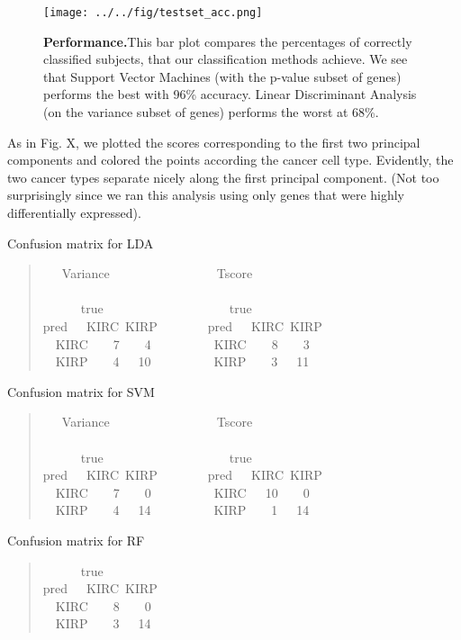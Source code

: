 \begin{figure}[H]
  \centering
    \texttt{[image: ../../fig/testset\_acc.png]}
\caption{\textbf{Performance.}This bar plot compares the percentages of correctly
  classified subjects, that our classification methods achieve. We see that
  Support Vector Machines (with the p-value subset of genes) performs the best
  with 96\% accuracy. Linear Discriminant Analysis (on the variance subset of
  genes) performs the worst at 68\%.}
   \label{fig:performance}
\end{figure}

 
As in Fig. X, we plotted the scores corresponding to the first two principal
components and colored the points according the cancer cell type. 
Evidently, the two cancer types separate nicely along the first
principal component. (Not too surprisingly since we ran this analysis using
only genes that were highly differentially expressed).  

Confusion matrix for LDA

\vspace*{\fill}
\begin{quote}{  \ttfamily \raggedright \noindent
\centering
~~~Variance~~~~~~~~~~~~~~~~~Tscore\\
~\\
~~~~~~true~~~~~~~~~~~~~~~~~~~~true\\
pred~~~KIRC~KIRP~~~~~~~~pred~~~KIRC~KIRP\\
~~KIRC~~~~7~~~~4~~~~~~~~~~KIRC~~~~8~~~~3\\
~~KIRP~~~~4~~~10~~~~~~~~~~KIRP~~~~3~~~11\\
}
\end{quote}
\vspace*{\fill}

Confusion matrix for SVM
\vspace*{\fill} 
\begin{quote}{ \ttfamily \raggedright \noindent
\centering
~~~Variance~~~~~~~~~~~~~~~~~Tscore\\
~\\
~~~~~~true~~~~~~~~~~~~~~~~~~~~true\\
pred~~~KIRC~KIRP~~~~~~~~pred~~~KIRC~KIRP\\
~~KIRC~~~~7~~~~0~~~~~~~~~~KIRC~~~10~~~~0\\
~~KIRP~~~~4~~~14~~~~~~~~~~KIRP~~~~1~~~14\\
}
\end{quote}
\vspace*{\fill}

Confusion matrix for RF
\vspace*{\fill}
\begin{quote}{ \ttfamily \raggedright \noindent
\centering
~~~~~~true\\
pred~~~KIRC~KIRP\\
~~KIRC~~~~8~~~~0\\
~~KIRP~~~~3~~~14\\
}
\end{quote}
\vspace*{\fill}






